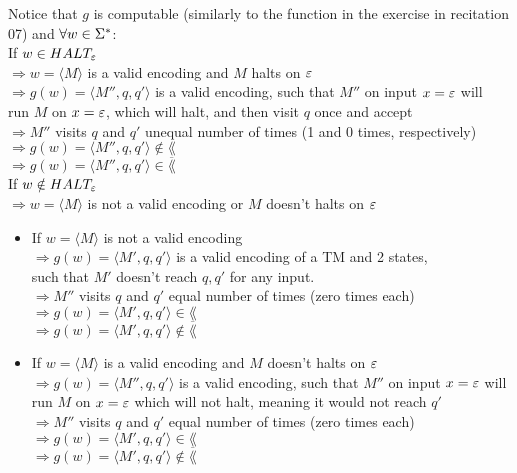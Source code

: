Notice that $g$ is computable (similarly to the function in the exercise in recitation 07) and $\forall w \in \Sigma^*$: \\
If $w \in HALT_\varepsilon$ \\
$\Longrightarrow w = \langle M \rangle$ is a valid encoding and $M$ halts on $\varepsilon$ \\
$\Longrightarrow g(w) = \langle M'', q, q' \rangle$ is a valid encoding, such that $M''$ on input $x = \varepsilon$ will \\
run $M$ on $x = \varepsilon$, which will halt, and then visit $q$ once and accept \\
$\Longrightarrow M''$ visits $q$ and $q'$ unequal number of times (1 and 0 times, respectively) \\
$\Longrightarrow g(w) = \langle M'', q, q' \rangle \notin \lang$ \\
$\Longrightarrow g(w) = \langle M'', q, q' \rangle \in \overline{\lang}$ \\

If $w \notin HALT_\varepsilon$ \\
$\Longrightarrow w = \langle M \rangle$ is not a valid encoding or $M$ doesn't halts on $\varepsilon$
\begin{itemize}
        \item If $w = \langle M \rangle$ is not a valid encoding \\
              $\Longrightarrow g(w) = \langle M', q, q' \rangle$ is a valid encoding of a TM and 2 states, \\
              such that $M'$ doesn't reach $q, q'$ for any input.  \\
              $\Longrightarrow M''$ visits $q$ and $q'$ equal number of times (zero times each) \\
              $\Longrightarrow g(w) = \langle M', q, q' \rangle \in \lang$ \\
              $\Longrightarrow g(w) = \langle M', q, q' \rangle \notin \overline{\lang}$

        \item If $w = \langle M \rangle$ is a valid encoding and $M$ doesn't halts on $\varepsilon$ \\
              $\Longrightarrow g(w) = \langle M'', q, q' \rangle$ is a valid encoding, such that $M''$ on input $x = \varepsilon$ will  \\
              run $M$ on $x = \varepsilon$ which will not halt, meaning it would not reach $q'$  \\
              $\Longrightarrow M''$ visits $q$ and $q'$ equal number of times (zero times each)  \\
              $\Longrightarrow g(w) = \langle M', q, q' \rangle \in \lang$ \\
              $\Longrightarrow g(w) = \langle M', q, q' \rangle \notin \overline{\lang}$
\end{itemize}


